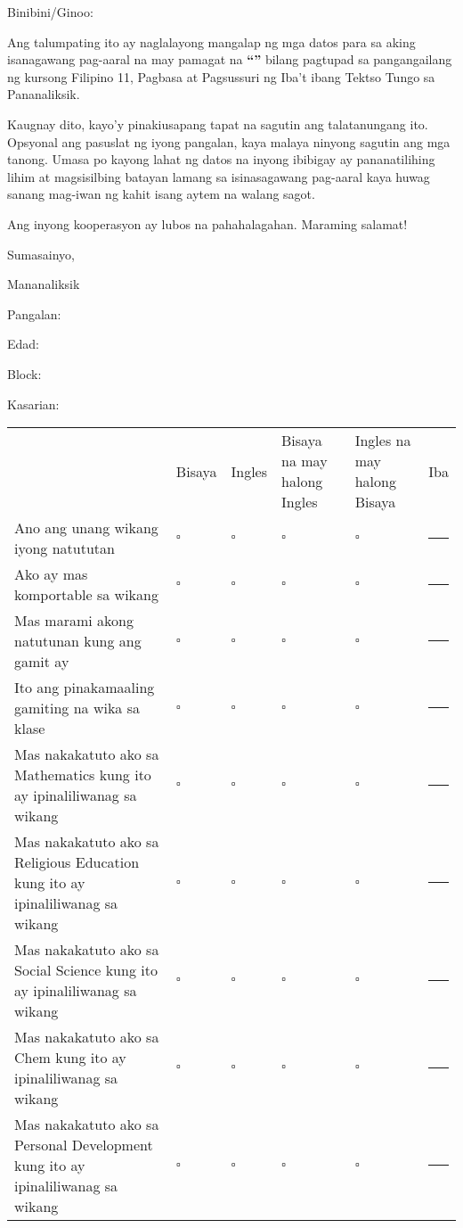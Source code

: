 \documentclass[
  parskip=half,
  backaddress=false,
  address=false,
  foldmarks=true,
  foldmarks=blmtP,
  version=last,
  paper=legal,
  enlargefirstpage=true,
  fromalign=left,
  addrfield=topaligned,
  ]{scrartcl}
\begin{document}
{

}
Binibini/Ginoo:

Ang talumpating ito ay naglalayong mangalap ng mga datos para sa aking
isanagawang pag-aaral na may pamagat na {\bfseries``\researchtitle''} bilang pagtupad sa
pangangailang ng kursong Filipino 11, Pagbasa at Pagsussuri ng Iba't ibang
Tektso Tungo sa Pananaliksik.

Kaugnay dito, kayo'y pinakiusapang tapat na sagutin ang talatanungang ito.
Opsyonal ang pasuslat ng iyong pangalan, kaya malaya ninyong sagutin ang mga
tanong. Umasa po kayong lahat ng datos na inyong ibibigay ay pananatilihing
lihim at magsisilbing batayan lamang sa isinasagawang pag-aaral kaya huwag
sanang mag-iwan ng kahit isang aytem na walang sagot.

Ang inyong kooperasyon ay lubos na pahahalagahan. Maraming salamat!

Sumasainyo,

Mananaliksik

\vfill

Pangalan: \hrulefill %

\begin{multicols}{3}
  Edad: \hrulefill\par
  Block: \hrulefill\par
  Kasarian: \hrulefill
\end{multicols}

\tabulinesep=0.2cm
\newcommand{\question}[1]{#1 & \(\square\) & \(\square\) & \(\square\) & \(\square\)
  & \hrule\\}
\begin{tabu} to 1\textwidth { X[2,l,m] X[1,c,m] X[1,c,m] X[1,c,m] X[1,c,m] X[1,c] }
  & Bisaya & Ingles & Bisaya na may halong Ingles & Ingles na may halong Bisaya & Iba \\
  \question {Ano ang unang wikang iyong natututan}
  \question {Ako ay mas komportable sa wikang}
  \question {Mas marami akong natutunan kung ang gamit ay}
  \question {Ito ang pinakamaaling gamiting na wika sa klase}
  \question {Mas nakakatuto ako sa Mathematics kung ito ay ipinaliliwanag sa wikang}
  \question {Mas nakakatuto ako sa Religious Education kung ito ay ipinaliliwanag sa wikang}
  \question {Mas nakakatuto ako sa Social Science kung ito ay ipinaliliwanag sa wikang}
  \question {Mas nakakatuto ako sa Chem kung ito ay ipinaliliwanag sa wikang}
  \question {Mas nakakatuto ako sa Personal Development kung ito ay ipinaliliwanag sa wikang}%
\end{tabu}

\pagebreak
\end{document}
